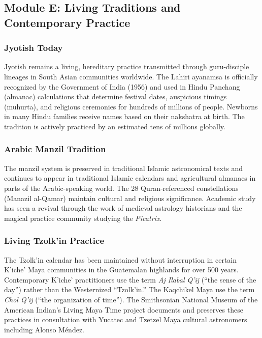 \documentclass[11pt,letterpaper]{article}
\begin{document}
\subsection{Module E: Living Traditions and Contemporary Practice}

\subsubsection{Jyotish Today}

Jyotish remains a living, hereditary practice transmitted through guru-disciple lineages in South Asian communities worldwide. The Lahiri ayanamsa is officially recognized by the Government of India (1956) and used in Hindu Panchang (almanac) calculations that determine festival dates, auspicious timings (muhurta), and religious ceremonies for hundreds of millions of people. Newborns in many Hindu families receive names based on their nakshatra at birth. The tradition is actively practiced by an estimated tens of millions globally.

\subsubsection{Arabic Manzil Tradition}

The manzil system is preserved in traditional Islamic astronomical texts and continues to appear in traditional Islamic calendars and agricultural almanacs in parts of the Arabic-speaking world. The 28 Quran-referenced constellations (Manazil al-Qamar) maintain cultural and religious significance. Academic study has seen a revival through the work of medieval astrology historians and the magical practice community studying the \textit{Picatrix}.

\subsubsection{Living Tzolk'in Practice}

The Tzolk'in calendar has been maintained without interruption in certain K'iche' Maya communities in the Guatemalan highlands for over 500 years. Contemporary K'iche' practitioners use the term \textit{Aj Ilabal Q'ij} (``the sense of the day'') rather than the Westernized ``Tzolk'in.'' The Kaqchikel Maya use the term \textit{Chol Q'ij} (``the organization of time''). The Smithsonian National Museum of the American Indian's Living Maya Time project documents and preserves these practices in consultation with Yucatec and Tzetzel Maya cultural astronomers including Alonso Méndez.
\end{document}
